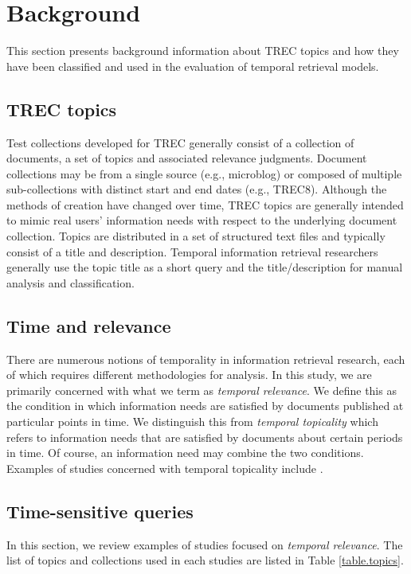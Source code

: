 \documentclass[runningheads,a4paper]{llncs}
\begin{document}
\section{Background}

This section presents background information about TREC topics and how they have been classified and used in the evaluation of temporal retrieval models.

\subsection{TREC topics}

Test collections developed for TREC generally consist of a collection of documents, a set of topics and associated relevance judgments. Document collections may be from a single source (e.g., microblog) or composed of multiple sub-collections with distinct start and end dates (e.g., TREC8).  Although the methods of creation have changed over time, TREC topics are generally intended to mimic real users' information needs with respect to the underlying document collection. Topics are distributed in a set of structured text files and typically consist of a title and description.  Temporal information retrieval researchers generally use the topic title as a short query and the title/description for manual analysis and classification.

\subsection{Time and relevance}

There are numerous notions of temporality in information retrieval research, each of which requires different methodologies for analysis. In this study, we are primarily concerned with what we term as \emph{temporal relevance}. We define this as the condition in which information needs are satisfied by documents published at particular points in time. We distinguish this from \emph{temporal topicality} which refers to information needs that are satisfied by documents about certain periods in time. Of course, an information need may combine the two conditions. Examples of studies concerned with temporal topicality include \cite{Berberich2010,Kanhabua2011}.

\subsection{Time-sensitive queries}

In this section, we review examples of studies focused on \emph{temporal relevance}.  The list of topics and collections used in each studies are listed in Table \ref{table.topics}. 
\end{document}
